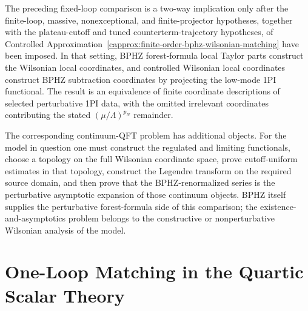 \begin{remark}
The preceding fixed-loop comparison is a two-way implication only after the
finite-loop, massive, nonexceptional, and finite-projector hypotheses,
together with the plateau-cutoff and tuned counterterm-trajectory hypotheses,
of Controlled
Approximation~\ref{capprox:finite-order-bphz-wilsonian-matching} have been
imposed.  In that setting, BPHZ forest-formula local Taylor parts construct
the Wilsonian local coordinates, and controlled Wilsonian local coordinates
construct BPHZ subtraction coordinates by projecting the low-mode 1PI
functional.  The result is an equivalence of finite coordinate descriptions
of selected perturbative 1PI data, with the omitted irrelevant coordinates
contributing the stated \((\mu/\Lambda)^{p_N}\) remainder.

The corresponding continuum-QFT problem has additional objects.  For the
model in question one must construct the regulated and limiting functionals,
choose a topology on the full Wilsonian coordinate space, prove
cutoff-uniform estimates in that topology, construct the Legendre transform on
the required source domain, and then prove that the BPHZ-renormalized series
is the perturbative asymptotic expansion of those continuum objects.  BPHZ
itself supplies the perturbative forest-formula side of this comparison; the
existence-and-asymptotics problem belongs to the constructive or
nonperturbative Wilsonian analysis of the model.
\end{remark}

\section{One-Loop Matching in the Quartic Scalar Theory}


